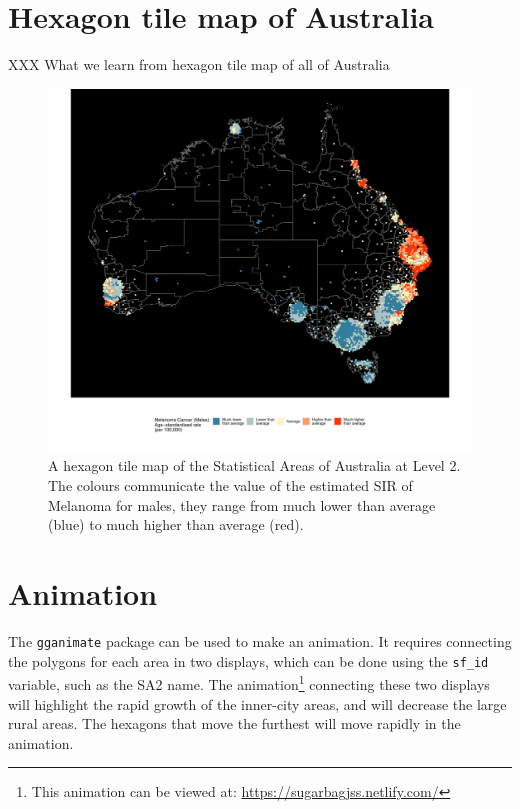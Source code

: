 \documentclass{monashthesis}
\begin{document}
\hypertarget{hexagon-tile-map-of-australia}{%
\section{Hexagon tile map of Australia}\label{hexagon-tile-map-of-australia}}

XXX
What we learn from hexagon tile map of all of Australia

\begin{figure}[H]
\centering
\includegraphics[width=14cm]{figures/03-algorithm/aus_gghexmap.pdf}
\caption{\label{fig:melanoma-geo}A hexagon tile map of the Statistical Areas of Australia at Level 2. The colours communicate the value of the estimated SIR of Melanoma for males, they range from much lower than average (blue) to much higher than average (red).}
\end{figure}

\hypertarget{animation}{%
\section{Animation}\label{animation}}

The \texttt{gganimate} \autocite{gganimate} package can be used to make an animation.
It requires connecting the polygons for each area in two displays, which can be done using the \texttt{sf\_id} variable, such as the SA2 name.
The animation\footnote{This animation can be viewed at: \url{https://sugarbagjss.netlify.com/}} connecting these two displays will highlight the rapid growth of the inner-city areas, and will decrease the large rural areas. The hexagons that move the furthest will move rapidly in the animation.
\end{document}
